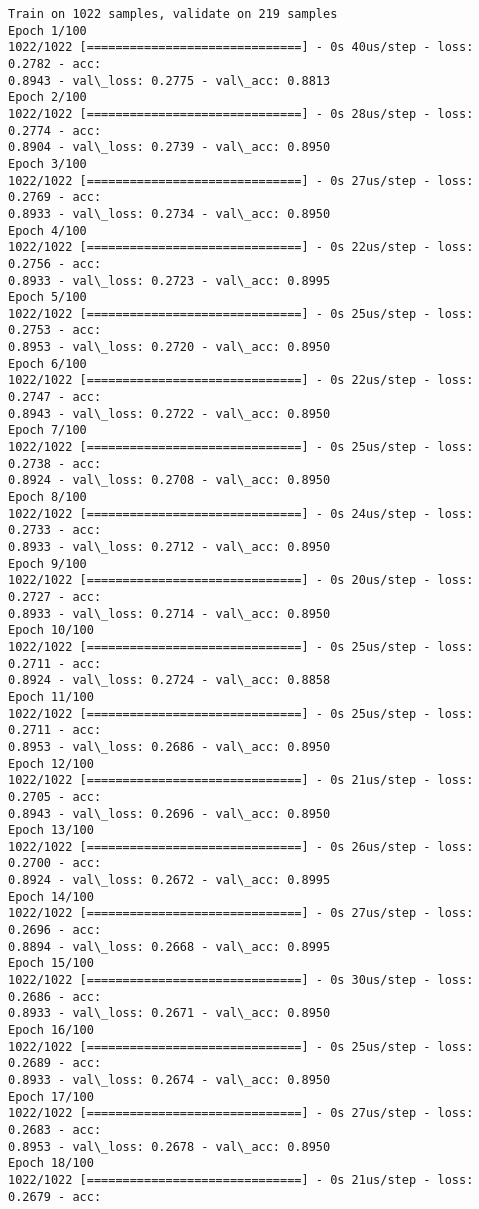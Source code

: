 \documentclass[11pt]{article}
\begin{document}
    \begin{Verbatim}[commandchars=\\\{\}]
Train on 1022 samples, validate on 219 samples
Epoch 1/100
1022/1022 [==============================] - 0s 40us/step - loss: 0.2782 - acc:
0.8943 - val\_loss: 0.2775 - val\_acc: 0.8813
Epoch 2/100
1022/1022 [==============================] - 0s 28us/step - loss: 0.2774 - acc:
0.8904 - val\_loss: 0.2739 - val\_acc: 0.8950
Epoch 3/100
1022/1022 [==============================] - 0s 27us/step - loss: 0.2769 - acc:
0.8933 - val\_loss: 0.2734 - val\_acc: 0.8950
Epoch 4/100
1022/1022 [==============================] - 0s 22us/step - loss: 0.2756 - acc:
0.8933 - val\_loss: 0.2723 - val\_acc: 0.8995
Epoch 5/100
1022/1022 [==============================] - 0s 25us/step - loss: 0.2753 - acc:
0.8953 - val\_loss: 0.2720 - val\_acc: 0.8950
Epoch 6/100
1022/1022 [==============================] - 0s 22us/step - loss: 0.2747 - acc:
0.8943 - val\_loss: 0.2722 - val\_acc: 0.8950
Epoch 7/100
1022/1022 [==============================] - 0s 25us/step - loss: 0.2738 - acc:
0.8924 - val\_loss: 0.2708 - val\_acc: 0.8950
Epoch 8/100
1022/1022 [==============================] - 0s 24us/step - loss: 0.2733 - acc:
0.8933 - val\_loss: 0.2712 - val\_acc: 0.8950
Epoch 9/100
1022/1022 [==============================] - 0s 20us/step - loss: 0.2727 - acc:
0.8933 - val\_loss: 0.2714 - val\_acc: 0.8950
Epoch 10/100
1022/1022 [==============================] - 0s 25us/step - loss: 0.2711 - acc:
0.8924 - val\_loss: 0.2724 - val\_acc: 0.8858
Epoch 11/100
1022/1022 [==============================] - 0s 25us/step - loss: 0.2711 - acc:
0.8953 - val\_loss: 0.2686 - val\_acc: 0.8950
Epoch 12/100
1022/1022 [==============================] - 0s 21us/step - loss: 0.2705 - acc:
0.8943 - val\_loss: 0.2696 - val\_acc: 0.8950
Epoch 13/100
1022/1022 [==============================] - 0s 26us/step - loss: 0.2700 - acc:
0.8924 - val\_loss: 0.2672 - val\_acc: 0.8995
Epoch 14/100
1022/1022 [==============================] - 0s 27us/step - loss: 0.2696 - acc:
0.8894 - val\_loss: 0.2668 - val\_acc: 0.8995
Epoch 15/100
1022/1022 [==============================] - 0s 30us/step - loss: 0.2686 - acc:
0.8933 - val\_loss: 0.2671 - val\_acc: 0.8950
Epoch 16/100
1022/1022 [==============================] - 0s 25us/step - loss: 0.2689 - acc:
0.8933 - val\_loss: 0.2674 - val\_acc: 0.8950
Epoch 17/100
1022/1022 [==============================] - 0s 27us/step - loss: 0.2683 - acc:
0.8953 - val\_loss: 0.2678 - val\_acc: 0.8950
Epoch 18/100
1022/1022 [==============================] - 0s 21us/step - loss: 0.2679 - acc:

\end{Verbatim}
\end{document}
